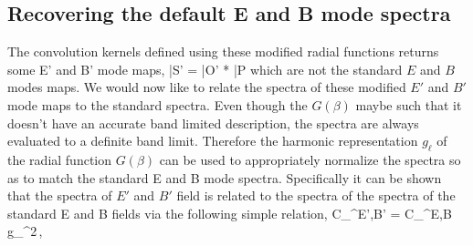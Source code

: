 
\subsection{Recovering the default E and B mode spectra}
The convolution kernels defined using these modified radial functions returns some E' and B' mode maps,
%
\beq
\bar{S}' = \bar{O}' * \bar{P}
\eeq
%
 which are not the standard $E$ and $B$ modes maps. We would now like to relate the spectra of these modified $E'$ and $B'$ mode maps to the standard spectra. Even though the $G(\beta)$ maybe such that it doesn't have an accurate band limited  description, the spectra are always evaluated to a definite band limit. Therefore the harmonic representation $g_{\ell}$ of the radial function $G(\beta)$ can be used to appropriately normalize the spectra so as to match the standard E and B mode spectra.
 Specifically it can be shown that the spectra of $E'$ and $B'$ field is related to the spectra of the spectra of the standard E and B fields via the following simple relation,
 \beq
 C_{\ell}^{E',B'} =  C_{\ell}^{E,B} g_{\ell}^2\,,
 \eeq
